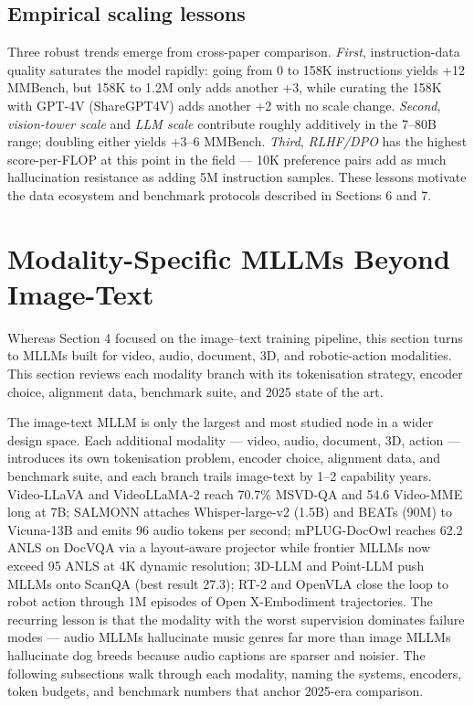 \documentclass{article}
\begin{document}
\subsection{Empirical scaling lessons}\label{empirical-scaling-lessons}

Three robust trends emerge from cross-paper comparison. \emph{First}, instruction-data quality saturates the model rapidly: going from 0 to 158K instructions yields +12 MMBench, but 158K to 1.2M only adds another +3, while curating the 158K with GPT-4V (ShareGPT4V) adds another +2 with no scale change. \emph{Second}, \emph{vision-tower scale} and \emph{LLM scale} contribute roughly additively in the 7--80B range; doubling either yields +3--6 MMBench. \emph{Third}, \emph{RLHF/DPO} has the highest score-per-FLOP at this point in the field --- 10K preference pairs add as much hallucination resistance as adding 5M instruction samples. These lessons motivate the data ecosystem and benchmark protocols described in Sections 6 and 7.

\section{Modality-Specific MLLMs Beyond Image-Text}\label{modality-specific-mllms-beyond-image-text}

Whereas Section 4 focused on the image--text training pipeline, this section turns to MLLMs built for video, audio, document, 3D, and robotic-action modalities. This section reviews each modality branch with its tokenisation strategy, encoder choice, alignment data, benchmark suite, and 2025 state of the art.

The image-text MLLM is only the largest and most studied node in a wider design space. Each additional modality --- video, audio, document, 3D, action --- introduces its own tokenisation problem, encoder choice, alignment data, and benchmark suite, and each branch trails image-text by 1--2 capability years. Video-LLaVA and VideoLLaMA-2 reach 70.7\% MSVD-QA and 54.6 Video-MME long at 7B; SALMONN attaches Whisper-large-v2 (1.5B) and BEATs (90M) to Vicuna-13B and emits 96 audio tokens per second; mPLUG-DocOwl reaches 62.2 ANLS on DocVQA via a layout-aware projector while frontier MLLMs now exceed 95 ANLS at 4K dynamic resolution; 3D-LLM and Point-LLM push MLLMs onto ScanQA (best result 27.3); RT-2 and OpenVLA close the loop to robot action through 1M episodes of Open X-Embodiment trajectories. The recurring lesson is that the modality with the worst supervision dominates failure modes --- audio MLLMs hallucinate music genres far more than image MLLMs hallucinate dog breeds because audio captions are sparser and noisier. The following subsections walk through each modality, naming the systems, encoders, token budgets, and benchmark numbers that anchor 2025-era comparison.
\end{document}
